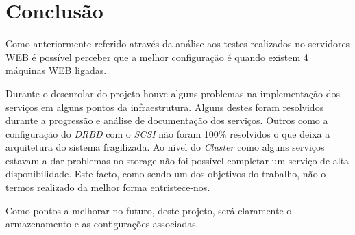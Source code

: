 \section{Conclusão}

Como anteriormente referido através da análise aos testes realizados no servidores WEB é possível perceber que a melhor configuração é quando existem 4 máquinas WEB ligadas.

Durante o desenrolar do projeto houve alguns problemas na implementação dos serviços em alguns pontos da infraestrutura. Alguns destes foram resolvidos durante a progressão e análise de documentação dos serviços. Outros como a configuração do \textit{DRBD} com o \textit{SCSI} não foram 100\% resolvidos o que deixa a arquitetura do sistema fragilizada. Ao nível do \textit{Cluster} como alguns serviços estavam a dar problemas no storage não foi possível completar um serviço de alta disponibilidade. Este facto, como sendo um dos objetivos do trabalho, não o termos realizado da melhor forma entristece-nos.

Como pontos a melhorar no futuro, deste projeto, será claramente o armazenamento e as configurações associadas.

